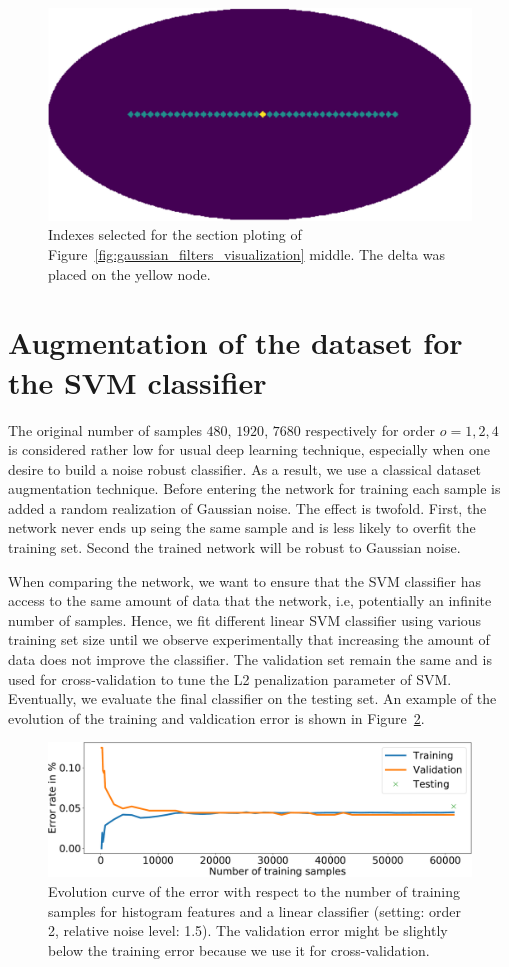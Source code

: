 \documentclass[final,twocolumn,3p,times,authoryear]{elsarticle}
\newcommand{\figref}[1]{Figure~\ref{fig:#1}}
\newcommand{\1}{\b{1}}              %
\newcommand{\0}{\b{0}}              %
\begin{document}
\begin{figure}[!ht]
\centering
\includegraphics[width=0.6\linewidth]{figures/index_plotting_order20_nside16.pdf}
\caption{Indexes selected for the section ploting of \figref{gaussian_filters_visualization} middle. The delta was placed on the yellow node.}
\label{fig:index_section}
\end{figure}

\section{Augmentation of the dataset for the SVM classifier}
\label{sec:dataset_augmentation} The original number of samples $480$, $1920$,
$7680$ respectively for order $o=1,2,4$ is considered rather low for usual
deep learning technique, especially when one desire to build a noise robust
classifier. As a result, we use a classical dataset augmentation technique.
Before entering the network for training each sample is added a random
realization of Gaussian noise. The effect is twofold. First, the network never
ends up seing the same sample and is less likely to overfit the training set.
Second the trained network will be robust to Gaussian noise.

When comparing the network, we want to ensure that the SVM classifier has
access to the same amount of data that the network, i.e, potentially an
infinite number of samples. Hence, we fit different linear SVM classifier using
various training set size until we observe experimentally that
increasing the amount of data does not improve the classifier. The validation
set remain the same and is used for cross-validation to tune the L2
penalization parameter of SVM. Eventually, we evaluate the final classifier on
the testing set. An example of the evolution of the training and valdication
error is shown in \figref{hist_error_evolution}.

\begin{figure}[!ht]
\centering
\includegraphics[width=\linewidth]{figures/hist_error_order2_noise1_5.pdf}
\caption{Evolution curve of the error with respect to the number of training samples for histogram features and a linear classifier (setting: order 2, relative noise level: 1.5). The validation error might be slightly below the training error because we use it for cross-validation.}
\label{fig:hist_error_evolution}
\end{figure}
\end{document}
